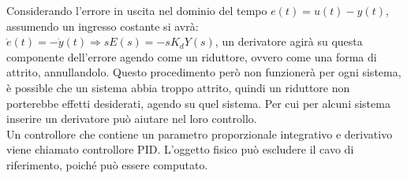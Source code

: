 \documentclass{article}
\numberwithin{equation}{subsection}
\begin{document}
Considerando l'errore in uscita nel dominio del tempo $e(t)=u(t)-y(t)$, assumendo un ingresso costante si avrà: $\dot e(t)=-\dot y(t)\Rightarrow sE(s)=-sK_dY(s)$, 
un derivatore agirà su questa componente dell'errore agendo come un riduttore, ovvero come una forma di attrito, annullandolo. Questo procedimento 
però non funzionerà per ogni sistema, è possible che un sistema abbia troppo attrito, quindi un riduttore non porterebbe effetti desiderati, agendo su quel sistema. 
Per cui per alcuni sistema inserire un derivatore può aiutare nel loro controllo. \\
Un controllore che contiene un parametro proporzionale 
integrativo e derivativo viene chiamato controllore PID. L'oggetto fisico può escludere il cavo di riferimento, poiché può essere computato. 

\begin{center}\end{center}
\end{document}
